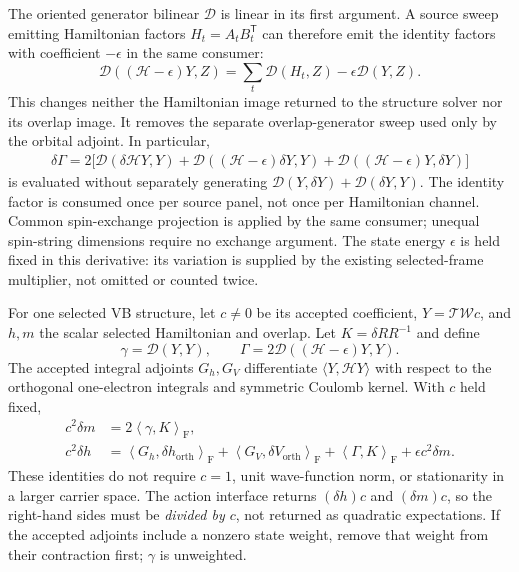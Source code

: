\documentclass[11pt,a4paper]{article}
\newcommand{\Tr}{^{\mathsf T}}
\newcommand{\ip}[2]{\left\langle #1,#2\right\rangle_{\mathrm F}}
\newcommand{\Wa}{\mathcal W}
\newcommand{\Ta}{\mathcal T}
\newcommand{\Ha}{\mathcal H}
\begin{document}
The oriented generator bilinear $\mathcal D$ is linear in its first
argument. A source sweep emitting Hamiltonian factors $H_t=A_tB_t\Tr$
can therefore emit the identity factors with coefficient $-\epsilon$ in
the same consumer:
\begin{equation}
 \mathcal D((\Ha-\epsilon)Y,Z)
 =\sum_t\mathcal D(H_t,Z)-\epsilon\mathcal D(Y,Z).
\end{equation}
This changes neither the Hamiltonian image returned to the structure
solver nor its overlap image. It removes the separate overlap-generator
sweep used only by the orbital adjoint. In particular,
\begin{align}
 \delta\Gamma=2\bigl[\mathcal D(\delta\Ha Y,Y)
  +\mathcal D((\Ha-\epsilon)\delta Y,Y)
  +\mathcal D((\Ha-\epsilon)Y,\delta Y)\bigr]
\end{align}
is evaluated without separately generating
$\mathcal D(Y,\delta Y)+\mathcal D(\delta Y,Y)$.
The identity factor is consumed once per source panel, not once per
Hamiltonian channel. Common spin-exchange projection is applied by the
same consumer; unequal spin-string dimensions require no exchange argument.
The state energy $\epsilon$ is held fixed in this derivative: its variation
is supplied by the existing selected-frame multiplier, not omitted or
counted twice.

For one selected VB structure, let $c\ne0$ be its accepted coefficient,
$Y=\Ta\Wa c$, and $h,m$ the scalar selected Hamiltonian and overlap.
Let $K=\delta R R^{-1}$ and define
\begin{equation}
 \gamma=\mathcal D(Y,Y),\qquad
 \Gamma=2\mathcal D((\Ha-\epsilon)Y,Y).
\end{equation}
The accepted integral adjoints $G_h,G_V$ differentiate
$\langle Y,\Ha Y\rangle$ with respect to the orthogonal one-electron
integrals and symmetric Coulomb kernel. With $c$ held fixed,
\begin{align}
 c^2\delta m&=2\ip{\gamma}{K},\\
 c^2\delta h&=\ip{G_h}{\delta h_{\mathrm{orth}}}
             +\ip{G_V}{\delta V_{\mathrm{orth}}}
             +\ip{\Gamma}{K}+\epsilon c^2\delta m.
\end{align}
These identities do not require $c=1$, unit wave-function norm, or
stationarity in a larger carrier space. The action interface returns
$(\delta h)c$ and $(\delta m)c$, so the right-hand sides must be
\emph{divided by $c$}, not returned as quadratic expectations.
If the accepted adjoints include a nonzero state weight, remove that weight
from their contraction first; $\gamma$ is unweighted.
\end{document}
